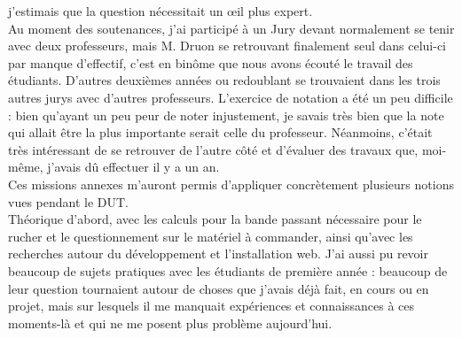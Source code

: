 \documentclass[11pt,french,a4paper]{report}
\begin{document}
j'estimais que la question nécessitait un œil plus expert. \\
Au moment des soutenances, j'ai participé à un Jury devant normalement se tenir avec deux professeurs, mais M. Druon se retrouvant 
finalement seul dans celui-ci par manque d'effectif, c'est en binôme que nous avons écouté le travail des étudiants.
D'autres deuxièmes années ou redoublant se trouvaient dans les trois autres jurys avec d'autres professeurs. 
L'exercice de notation a été un peu difficile : bien qu'ayant un peu peur de noter injustement,
je savais très bien que la note qui allait être la plus importante serait celle 
du professeur. Néanmoins, c'était très intéressant de se retrouver de l'autre côté et d'évaluer des travaux que, moi-même, 
j'avais dû effectuer il y a un an. \\
Ces missions annexes m'auront permis d'appliquer concrètement plusieurs notions vues pendant le DUT. \\
Théorique d'abord, avec les calculs pour la bande passant nécessaire pour le rucher et le questionnement sur le matériel à commander, ainsi
qu'avec les recherches autour du développement et l'installation web. 
J'ai aussi pu revoir beaucoup de sujets pratiques avec les étudiants de première année : beaucoup de leur question tournaient autour 
de choses que j'avais déjà fait, en cours ou en projet,  mais sur lesquels il me manquait expériences et connaissances à ces moments-là et
qui ne me posent plus problème aujourd'hui. \\
\end{document}
